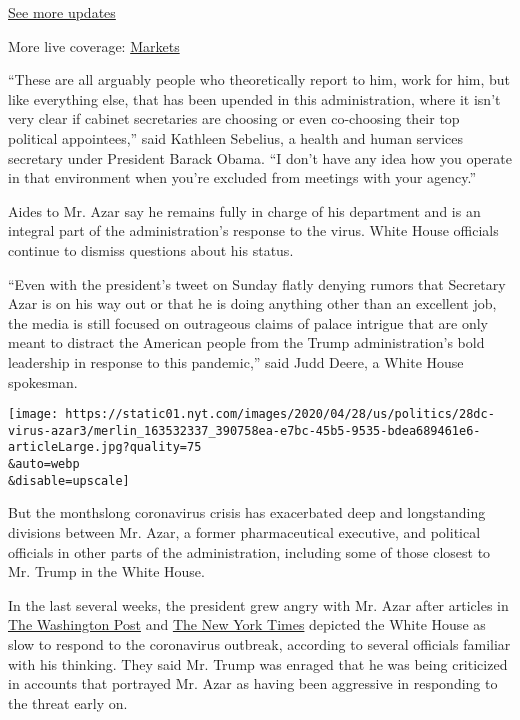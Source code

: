 \href{https://www.nytimes.com/2020/08/01/world/coronavirus-covid-19.html?action=click\&pgtype=Article\&state=default\&region=MAIN_CONTENT_1\&context=storylines_live_updates}{See
more updates}

More live coverage:
\href{https://www.nytimes.com/live/2020/07/31/business/stock-market-today-coronavirus?action=click\&pgtype=Article\&state=default\&region=MAIN_CONTENT_1\&context=storylines_live_updates}{Markets}

``These are all arguably people who theoretically report to him, work
for him, but like everything else, that has been upended in this
administration, where it isn't very clear if cabinet secretaries are
choosing or even co-choosing their top political appointees,'' said
Kathleen Sebelius, a health and human services secretary under President
Barack Obama. ``I don't have any idea how you operate in that
environment when you're excluded from meetings with your agency.''

Aides to Mr. Azar say he remains fully in charge of his department and
is an integral part of the administration's response to the virus. White
House officials continue to dismiss questions about his status.

``Even with the president's tweet on Sunday flatly denying rumors that
Secretary Azar is on his way out or that he is doing anything other than
an excellent job, the media is still focused on outrageous claims of
palace intrigue that are only meant to distract the American people from
the Trump administration's bold leadership in response to this
pandemic,'' said Judd Deere, a White House spokesman.

\texttt{[image: https://static01.nyt.com/images/2020/04/28/us/politics/28dc-virus-azar3/merlin\_163532337\_390758ea-e7bc-45b5-9535-bdea689461e6-articleLarge.jpg?quality=75\\\&auto=webp\\\&disable=upscale]}

But the monthslong coronavirus crisis has exacerbated deep and
longstanding divisions between Mr. Azar, a former pharmaceutical
executive, and political officials in other parts of the administration,
including some of those closest to Mr. Trump in the White House.

In the last several weeks, the president grew angry with Mr. Azar after
articles in
\href{https://www.washingtonpost.com/politics/trump-coronavirus-response-squandered-time/2020/03/07/5c47d3d0-5fcb-11ea-9055-5fa12981bbbf_story.html}{The
Washington Post} and
\href{https://www.nytimes.com/2020/03/28/us/testing-coronavirus-pandemic.html}{The
New York Times} depicted the White House as slow to respond to the
coronavirus outbreak, according to several officials familiar with his
thinking. They said Mr. Trump was enraged that he was being criticized
in accounts that portrayed Mr. Azar as having been aggressive in
responding to the threat early on.

